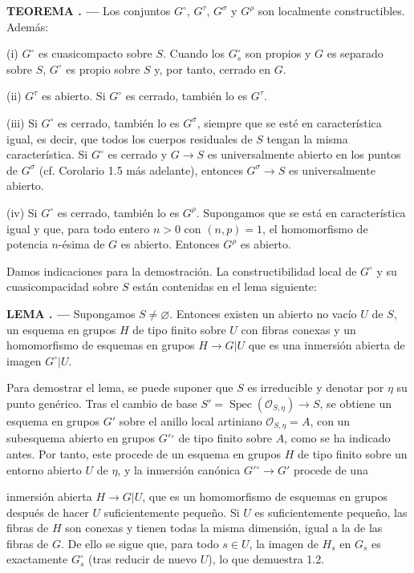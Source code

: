 \documentclass[11pt,twoside,openany]{book}
\numberwithin{equation}{section}
\newcommand{\src}[1]{%
  \phantomsection\hypertarget{src:#1}{}%
  \marginpar{\raggedleft\footnotesize\sffamily #1}%
}
\theoremstyle{plain}
\theoremstyle{definition}
\theoremstyle{remark}
\newcommand{\result}[2]{%
  \par\medskip\noindent\textbf{#1%
  \if\relax\detokenize{#2}\relax\else\space#2\fi. ---}\enspace
}
\newcommand{\FgaUnitKey}{frontmatter}
\renewcommand{\src}[1]{%
  \phantomsection\hypertarget{src:\FgaUnitKey:#1}{}%
  \marginpar{\raggedleft\footnotesize\sffamily #1}%
}
\theoremstyle{plain}
\theoremstyle{definition}
\theoremstyle{remark}
\begin{document}
\result{TEOREMA}{1.1} Los conjuntos $G^\circ$, $G^\tau$, $G^\sigma$ y $G^\rho$
son localmente constructibles. Además:

\noindent (i) $G^\circ$ es cuasicompacto sobre $S$. Cuando los $G_s^\circ$ son
propios y $G$ es separado sobre $S$, $G^\circ$ es propio sobre $S$ y, por
tanto, cerrado en $G$.

\noindent (ii) $G^\tau$ es abierto. Si $G^\circ$ es cerrado, también lo es
$G^\tau$.

\noindent (iii) Si $G^\circ$ es cerrado, también lo es $G^\sigma$, siempre que
se esté en característica igual, es decir, que todos los cuerpos residuales de
$S$ tengan la misma característica. Si $G^\circ$ es cerrado y
$G\longrightarrow S$ es universalmente abierto en los puntos de $G^\sigma$
(cf. Corolario 1.5 más adelante), entonces $G^\sigma\longrightarrow S$ es
universalmente abierto.

\noindent (iv) Si $G^\circ$ es cerrado, también lo es $G^\rho$. Supongamos que
se está en característica igual y que, para todo entero $n>0$ con $(n,p)=1$,
el homomorfismo de potencia $n$-ésima de $G$ es abierto. Entonces $G^\rho$ es
abierto.

Damos indicaciones para la demostración. La constructibilidad local de
$G^\circ$ y su cuasicompacidad sobre $S$ están contenidas en el lema siguiente:

\result{LEMA}{1.2} Supongamos $S\neq\varnothing$. Entonces existen un abierto
no vacío $U$ de $S$, un esquema en grupos $H$ de tipo finito sobre $U$ con
fibras conexas y un homomorfismo de esquemas en grupos
$H\longrightarrow G|U$ que es una inmersión abierta de imagen $G^\circ|U$.

Para demostrar el lema, se puede suponer que $S$ es irreducible y denotar por
$\eta$ su punto genérico. Tras el cambio de base
$S'=\operatorname{Spec}(\mathcal O_{S,\eta})\longrightarrow S$, se obtiene un
esquema en grupos $G'$ sobre el anillo local artiniano
$\mathcal O_{S,\eta}=A$, con un subesquema abierto en grupos $G'{}^\circ$ de
tipo finito sobre $A$, como se ha indicado antes. Por tanto, este procede de un
esquema en grupos $H$ de tipo finito sobre un entorno abierto $U$ de $\eta$, y
la inmersión canónica $G'{}^\circ\longrightarrow G'$ procede de una

\src{225}
inmersión abierta $H\longrightarrow G|U$, que es un homomorfismo de esquemas en
grupos después de hacer $U$ suficientemente pequeño. Si $U$ es suficientemente
pequeño, las fibras de $H$ son conexas y tienen todas la misma dimensión,
igual a la de las fibras de $G$. De ello se sigue que, para todo $s\in U$, la
imagen de $H_s$ en $G_s$ es exactamente $G_s^\circ$ (tras reducir de nuevo
$U$), lo que demuestra 1.2.
\end{document}
